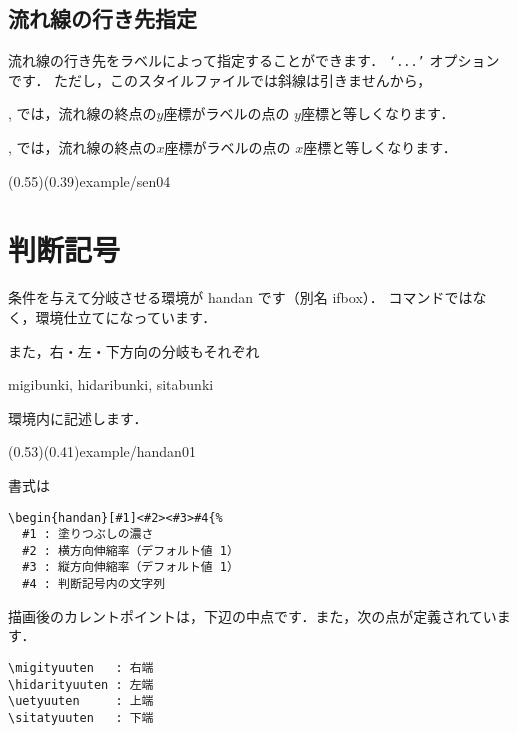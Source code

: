 \documentclass[a4j]{jarticle}
\begin{document}
\subsection{流れ線の行き先指定}
流れ線の行き先をラベルによって指定することができます．
\texttt{`...'} オプションです．
ただし，このスタイルファイルでは斜線は引きませんから，
\begin{jquotation}
,  では，流れ線の終点の$y$座標がラベルの点の
$y$座標と等しくなります．

,  では，流れ線の終点の$x$座標がラベルの点の
$x$座標と等しくなります．

\showexample[流れ線の行き先指定](0.55)(0.39){example/sen04}

\end{jquotation}

\section{判断記号}
条件を与えて分岐させる環境が \textsf{handan} です（別名 \textsf{ifbox}）．
コマンドではなく，環境仕立てになっています．

また，右・左・下方向の分岐もそれぞれ
\begin{jquote}
\textsf{migibunki}, \textsf{hidaribunki}, \textsf{sitabunki}
\end{jquote}
環境内に記述します．

(0.53)(0.41){example/handan01}

書式は
\begin{boxnote}
\begin{verbatim}
\begin{handan}[#1]<#2><#3>#4{%
  #1 : 塗りつぶしの濃さ
  #2 : 横方向伸縮率（デフォルト値 1）
  #3 : 縦方向伸縮率（デフォルト値 1）
  #4 : 判断記号内の文字列
\end{verbatim}
\end{boxnote}

描画後のカレントポイントは，下辺の中点です．また，次の点が定義されています．
\begin{jquote}
\begin{verbatim}
\migityuuten   : 右端
\hidarityuuten : 左端
\uetyuuten     : 上端
\sitatyuuten   : 下端
\end{verbatim}
\end{jquote}
\end{document}
